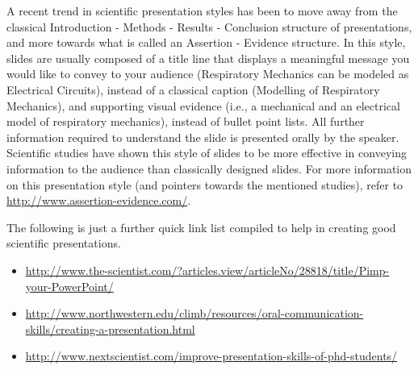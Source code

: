 A recent trend in scientific presentation styles has been to move away from the classical \glqq Introduction - Methods - Results - Conclusion\grqq{} structure of presentations, and more towards what is called an \glqq Assertion - Evidence\grqq{} structure.
In this style, slides are usually composed of a title line that displays a meaningful message you would like to convey to your audience (\glqq Respiratory Mechanics can be modeled as Electrical Circuits\grqq{}), instead of a classical caption (\glqq Modelling of Respiratory Mechanics\grqq{}), and supporting visual evidence (i.e., a mechanical and an electrical model of respiratory mechanics), instead of bullet point lists.
All further information required to understand the slide is  presented orally by the speaker.
Scientific studies have shown this style of slides to be more effective in conveying information to the audience than classically designed slides.
For more information on this presentation style (and pointers towards the mentioned studies), refer to \url{http://www.assertion-evidence.com/}.

The following is just a further quick link list compiled to help in creating good scientific presentations.
\begin{itemize}
\item \url{http://www.the-scientist.com/?articles.view/articleNo/28818/title/Pimp-your-PowerPoint/}
\item \url{http://www.northwestern.edu/climb/resources/oral-communication-skills/creating-a-presentation.html}
\item \url{http://www.nextscientist.com/improve-presentation-skills-of-phd-students/}
\end{itemize}


